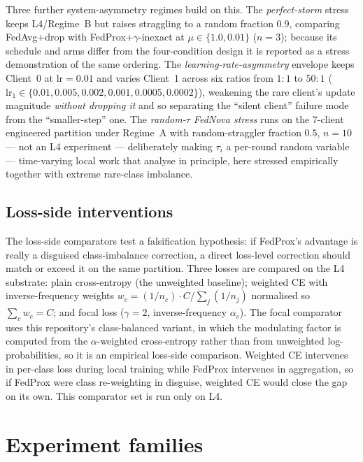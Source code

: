\documentclass[11pt,a4paper]{report}
\begin{document}
Three further system-asymmetry regimes build on this. The \emph{perfect-storm}
stress keeps L4/Regime~B but raises straggling to a random fraction $0.9$,
comparing FedAvg+drop with FedProx+$\gamma$-inexact at $\mu \in \{1.0, 0.01\}$
($n = 3$); because its schedule and arms differ from the four-condition design it
is reported as a stress demonstration of the same ordering. The
\emph{learning-rate-asymmetry} envelope keeps Client~0 at
$\textrm{lr} = 0.01$ and varies Client~1 across six ratios from $1{:}1$ to $50{:}1$
($\textrm{lr}_1 \in \{0.01, 0.005, 0.002, 0.001, 0.0005, 0.0002\}$), weakening the
rare client's update magnitude \emph{without dropping it} and so separating the
``silent client'' failure mode from the ``smaller-step'' one. The
\emph{random-$\tau$ FedNova stress} runs on
the 7-client engineered partition under Regime~A with random-straggler fraction
$0.5$, $n = 10$ --- not an L4 experiment --- deliberately making $\tau_i$ a
per-round random variable --- time-varying local work that
\citet{wang2020fednova} analyse in principle, here stressed empirically
together with extreme rare-class imbalance.


\subsection{Loss-side interventions}
\label{sec:method-losses}

The loss-side comparators test a falsification hypothesis: if FedProx's advantage
is really a disguised class-imbalance correction, a direct loss-level correction
should match or exceed it on the same partition. Three losses are compared on the
L4 substrate: plain cross-entropy (the unweighted baseline); weighted CE with
inverse-frequency weights $w_c = (1/n_c)\cdot C / \sum_j (1/n_j)$ normalised so
$\sum_c w_c = C$; and focal loss \citep{lin2017focal} ($\gamma = 2$,
inverse-frequency $\alpha_c$). The focal comparator uses this repository's
class-balanced variant, in which the modulating factor is computed from the
$\alpha$-weighted cross-entropy rather than from unweighted log-probabilities, so
it is an empirical loss-side comparison. Weighted CE intervenes in per-class loss during local training while FedProx
intervenes in aggregation, so if FedProx were class re-weighting in disguise,
weighted CE would close the gap on its own. This comparator set is run only on L4.

\section{Experiment families}
\label{sec:method-roadmap}
\end{document}
